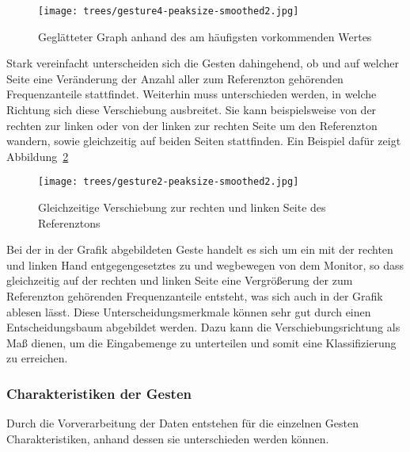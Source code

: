 \begin{figure}[htbp] \centering
\texttt{[image: trees/gesture4-peaksize-smoothed2.jpg]}
\caption{Geglätteter Graph anhand des am häufigsten vorkommenden Wertes}
\label{fig:frequent_value}
\end{figure}


Stark vereinfacht unterscheiden sich die Gesten dahingehend, ob und auf welcher Seite 
eine Veränderung der Anzahl aller zum Referenzton gehörenden Frequenzanteile stattfindet. 
Weiterhin muss unterschieden werden, in welche Richtung sich diese Verschiebung ausbreitet. 
Sie kann beispielsweise von der rechten zur linken oder von der linken zur rechten Seite 
um den Referenzton wandern, sowie gleichzeitig auf beiden Seiten stattfinden. 
Ein Beispiel dafür zeigt Abbildung~\ref{fig:left_right_same_time}

\begin{figure}[htbp] \centering
\texttt{[image: trees/gesture2-peaksize-smoothed2.jpg]}
\caption{Gleichzeitige Verschiebung zur rechten und linken Seite des Referenztons}
\label{fig:left_right_same_time}
\end{figure}

Bei der in der Grafik abgebildeten Geste handelt es sich um ein mit der rechten und linken Hand entgegengesetztes zu und 
wegbewegen von dem Monitor, so dass gleichzeitig auf der rechten und linken Seite eine Vergrößerung der 
zum Referenzton gehörenden Frequenzanteile entsteht, was sich auch in der Grafik ablesen lässt.
Diese Unterscheidungsmerkmale können sehr gut durch einen Entscheidungsbaum abgebildet werden. 
Dazu kann die Verschiebungsrichtung als Maß dienen, um die Eingabemenge zu unterteilen und 
somit eine Klassifizierung zu erreichen.

\subsubsection{Charakteristiken der Gesten} \label{charakteristiken}
Durch die Vorverarbeitung der Daten entstehen für die einzelnen Gesten Charakteristiken, anhand dessen sie unterschieden werden können. 



